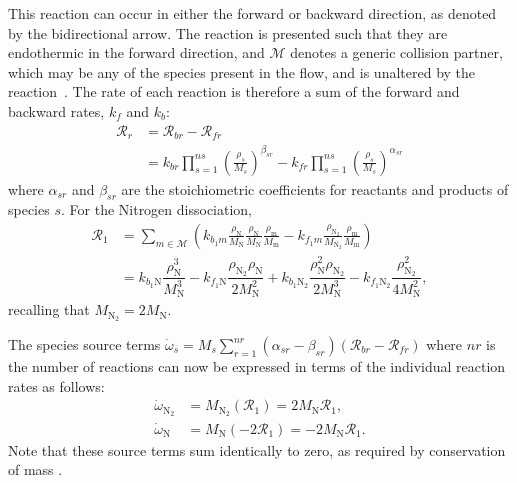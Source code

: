 \documentclass[10pt]{article}
\begin{document}
This reaction can occur in either the forward or backward direction, as denoted by the bidirectional arrow. The reaction is presented such that they are endothermic in the forward direction, and $\mathcal{M}$ denotes a generic collision partner, which may be any of the species present in the flow, and  is unaltered by the reaction~\citep{Kirk2009}.
The rate of each reaction is therefore a sum of the forward and backward rates,  $k_{f}$ and $k_{b}$:
\begin{equation*}
 \begin{split}
\mathcal{R}_r &=  \mathcal{R}_{br} - \mathcal{R}_{fr} \\
                &= k_{br} \prod_{s=1}^{ns} \left(\frac{\rho_s}{M_s}\right)^{\beta_{sr}} - k_{fr} \prod_{s=1}^{ns} \left(\frac{\rho_s}{M_s}\right)^{\alpha_{sr}}
 \end{split}
\end{equation*}
where $\alpha_{sr}$ and $\beta_{sr}$ are the stoichiometric coefficients for reactants and products of species $s$.
For the Nitrogen dissociation,
\begin{align}\label{eq:reaction1}
 \mathcal{R}_1 &= \sum_{m\in\mathcal{M}}\left(k_{b_1 m} \frac{\rho_{\text{N}}}{M_{\text{N}}}\frac{\rho_{\text{N}}}{M_{\text{N}}}\frac{\rho_{\text{m}}}{M_{\text{m}}} - k_{f_1 m}\frac{\rho_{\text{N}_2}}{M_{\text{N}_2}}\frac{\rho_{\text{m}}}{M_{\text{m}}} \right) \\
%
&= k_{b_1 \text{N}} \dfrac{\rho_{\text{N}}^3}{M_\text{N}^3} -
k_{f_1 \text{N}}   \dfrac{\rho_{\text{N}_2} \rho_{\text{N}}}{2  M_\text{N}^2}+
k_{b_1 \text{N}_2} \dfrac{\rho_\text{N}^2 \rho_{\text{N}_2}}{2M_\text{N}^3 }-
k_{f_1 \text{N}_2} \dfrac{\rho_{\text{N}_2}^2}{4 M_\text{N}^2},
\end{align}
recalling that $M_{\text{N}_2}=2 M_\text{N}.$


The species source terms $\dot{\omega}_s = M_s \sum_{r=1}^{nr}\left(\alpha_{sr}-\beta_{sr}\right)\left(\mathcal{R}_{br} - \mathcal{R}_{fr}\right)$ 
 where $nr$ is the number of reactions can now be expressed in terms of the individual reaction rates as follows:
\begin{align*}
 \dot{\omega}_{\text{N}_2} &= M_{\text{N}_2}\left(\mathcal{R}_1\right)= 2 M_\text{N} \mathcal{R}_1 ,\\
 \dot{\omega}_{\text{N}} &= M_{\text{N}}\left(-2\mathcal{R}_1 \right)=-2 M_\text{N} \mathcal{R}_1. 
\end{align*}
Note that these source terms sum identically to zero, as required by conservation of mass \citep{Kessler2004}.
\end{document}
